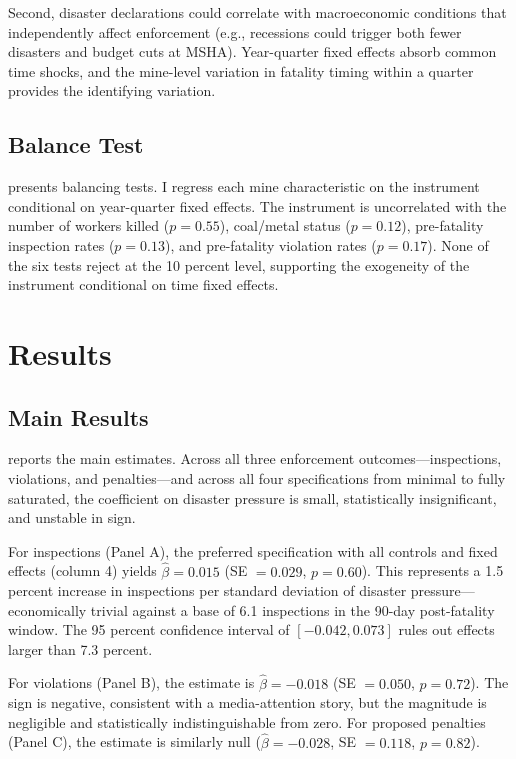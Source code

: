 \documentclass[12pt]{article}
\begin{document}
Second, disaster declarations could correlate with macroeconomic conditions that independently affect enforcement (e.g., recessions could trigger both fewer disasters and budget cuts at MSHA). Year-quarter fixed effects absorb common time shocks, and the mine-level variation in fatality timing within a quarter provides the identifying variation.

\subsection{Balance Test}

 presents balancing tests. I regress each mine characteristic on the instrument conditional on year-quarter fixed effects. The instrument is uncorrelated with the number of workers killed ($p = 0.55$), coal/metal status ($p = 0.12$), pre-fatality inspection rates ($p = 0.13$), and pre-fatality violation rates ($p = 0.17$). None of the six tests reject at the 10 percent level, supporting the exogeneity of the instrument conditional on time fixed effects.




\section{Results}

\subsection{Main Results}

 reports the main estimates. Across all three enforcement outcomes---inspections, violations, and penalties---and across all four specifications from minimal to fully saturated, the coefficient on disaster pressure is small, statistically insignificant, and unstable in sign.

For inspections (Panel A), the preferred specification with all controls and fixed effects (column 4) yields $\hat{\beta} = 0.015$ (SE $= 0.029$, $p = 0.60$). This represents a 1.5 percent increase in inspections per standard deviation of disaster pressure---economically trivial against a base of 6.1 inspections in the 90-day post-fatality window. The 95 percent confidence interval of $[-0.042, 0.073]$ rules out effects larger than 7.3 percent.

For violations (Panel B), the estimate is $\hat{\beta} = -0.018$ (SE $= 0.050$, $p = 0.72$). The sign is negative, consistent with a media-attention story, but the magnitude is negligible and statistically indistinguishable from zero. For proposed penalties (Panel C), the estimate is similarly null ($\hat{\beta} = -0.028$, SE $= 0.118$, $p = 0.82$).
\end{document}
